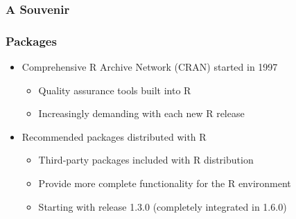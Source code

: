 \documentclass[svgnames]{beamer}
\begin{document}
\begin{frame}
  \frametitle{A Souvenir}

  \centering

\end{frame}

\begin{frame}
  \frametitle{Packages}

  \begin{itemize}
  \item Comprehensive R Archive Network (CRAN) started in 1997
    \begin{itemize}
    \item Quality assurance tools built into R
    \item Increasingly demanding with each new R release
    \end{itemize}
  \item Recommended packages distributed with R
    \begin{itemize}
    \item Third-party packages included with R distribution
    \item Provide more complete functionality for the R environment
    \item Starting with release 1.3.0 (completely integrated in 1.6.0)
    \end{itemize}
  \end{itemize}
  
\end{frame}
\end{document}
